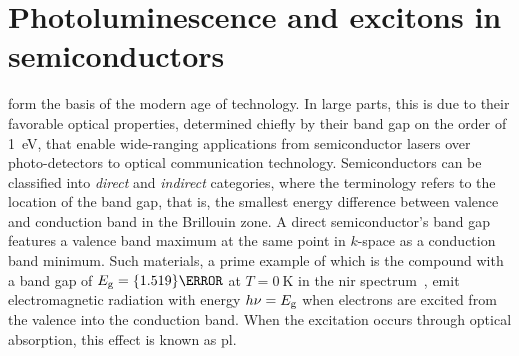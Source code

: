 \chapter{Photoluminescence and excitons in semiconductors}\label{ch:exp:theory}
 form the basis of the modern age of technology.
In large parts, this is due to their favorable optical properties, determined chiefly by their band gap on the order of \qty{1}{\electronvolt}, that enable wide-ranging applications from semiconductor lasers over photo-detectors to optical communication technology.
Semiconductors can be classified into \emph{direct} and \emph{indirect} categories, where the terminology refers to the location of the band gap, that is, the smallest energy difference between valence and conduction band in the Brillouin zone.
A direct semiconductor's band gap features a valence band maximum at the same point in $k$-space as a conduction band minimum.
Such materials, a prime example of which is the compound  with a band gap of $E_{\mr{g}}=\qty{1.519}{\electronvolt}$ at $T=\qty{0}{\kelvin}$ in the \gls{nir} spectrum~\cite{Vurgaftman2001}, emit electromagnetic radiation with energy $h\nu = E_{\mathrm{g}}$ when electrons are excited from the valence into the conduction band.
When the excitation occurs through optical absorption, this effect is known as \acrlong{pl}.

